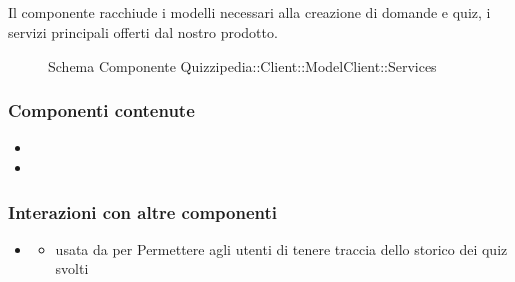 \subsection{}
Il componente racchiude i modelli necessari alla creazione di domande e quiz, i servizi principali offerti dal nostro prodotto.
\begin{figure}[H]
\centering
\noindent{}
\caption[Schema Componente Quizzipedia::Client::ModelClient::Services]{Schema Componente Quizzipedia::Client::ModelClient::Services}
\end{figure}
\subsubsection{Componenti contenute}
\begin{itemize}
\item {}
\item {}
\end{itemize}
\subsubsection{Interazioni con altre componenti}
\begin{itemize}
\item {}
\begin{itemize}
\item usata da  per Permettere agli utenti di tenere traccia dello storico dei quiz svolti
\end{itemize}
\end{itemize}
